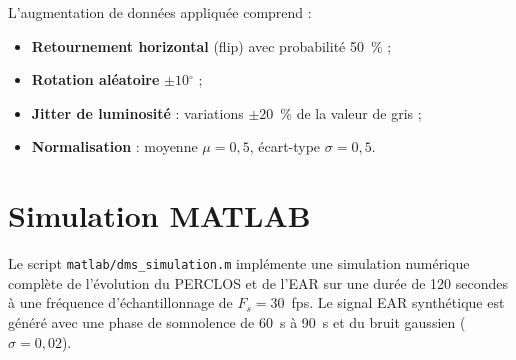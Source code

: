 \documentclass[12pt,a4paper]{report}
\newcommand{\degr}{\ensuremath{^{\circ}}}
\begin{document}
L'augmentation de donn\'ees appliqu\'ee comprend :
\begin{itemize}
  \item \textbf{Retournement horizontal} (flip) avec probabilit\'e 50~\% ;
  \item \textbf{Rotation al\'eatoire} $\pm 10\degr$ ;
  \item \textbf{Jitter de luminosit\'e} : variations $\pm 20$~\% de la valeur de gris ;
  \item \textbf{Normalisation} : moyenne $\mu = 0{,}5$, \'ecart-type $\sigma = 0{,}5$.
\end{itemize}

\section{Simulation MATLAB}

Le script \texttt{matlab/dms\_simulation.m} impl\'emente une simulation num\'erique compl\`ete de l'\'evolution du PERCLOS et de l'EAR sur une dur\'ee de 120 secondes \`a une fr\'equence d'\'echantillonnage de $F_s = 30$~fps. Le signal EAR synth\'etique est g\'en\'er\'e avec une phase de somnolence de 60~s \`a 90~s et du bruit gaussien ($\sigma = 0{,}02$).
\end{document}
